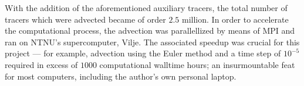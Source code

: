 With the addition of the aforementioned auxiliary tracers, the total number
of tracers which were advected became of order $2.5$ million. In order to
accelerate the computational process, the advection was parallellized by means
of MPI and ran on NTNU's supercomputer, Vilje. The associated speedup was
crucial for this project --- for example, advection using the Euler method
and a time step of $10^{-5}$ required in excess of $1000$ computational
walltime hours; an insurmountable feat for most computers, including the
author's own personal laptop.
\vspace{\fill}
